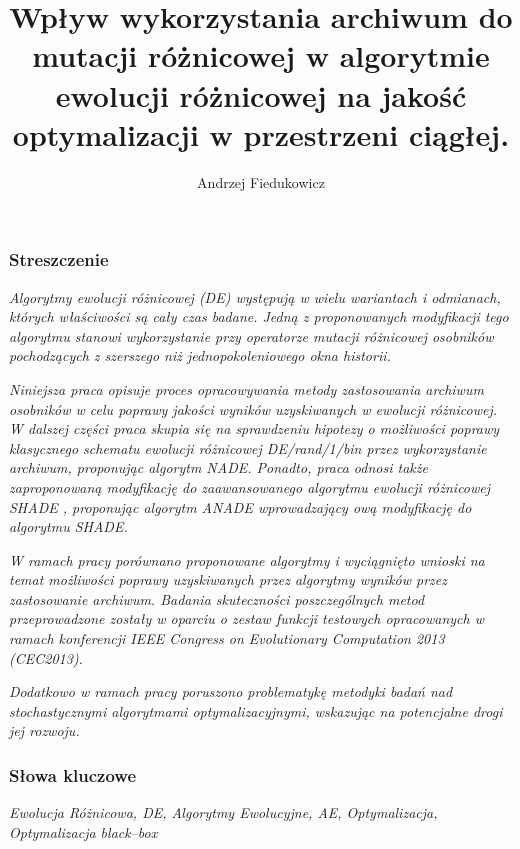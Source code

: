 \documentclass[12pt,a4paper]{report}
\title{\textbf{Wpływ wykorzystania archiwum do mutacji różnicowej w algorytmie ewolucji różnicowej na jakość optymalizacji w przestrzeni ciągłej.}}
\author{Andrzej Fiedukowicz}
\date{}
\begin{document}
\makeatletter
\renewcommand{\ALG@name}{Algorytm}


\maketitle
\tableofcontents


\newpage
\subsubsection{Streszczenie}
\par{
\emph{
Algorytmy ewolucji różnicowej (DE) występują w wielu wariantach i odmianach, których właściwości są cały czas badane. Jedną z proponowanych modyfikacji tego algorytmu stanowi wykorzystanie przy operatorze mutacji różnicowej osobników pochodzących z szerszego niż jednopokoleniowego okna historii.
}
}
\par{
\emph{
Niniejsza praca opisuje proces opracowywania metody zastosowania archiwum osobników w celu poprawy jakości wyników uzyskiwanych w ewolucji różnicowej. W dalszej części praca skupia się na sprawdzeniu hipotezy o możliwości poprawy klasycznego schematu ewolucji różnicowej \emph{DE/rand/1/bin} przez wykorzystanie archiwum, proponując algorytm \emph{NADE}.
Ponadto, praca odnosi także zaproponowaną modyfikację do zaawansowanego algorytmu ewolucji różnicowej \emph{SHADE} \cite{SHADE}, proponując algorytm \emph{ANADE} wprowadzający ową modyfikację do algorytmu \emph{SHADE}.
}
}
\par{
\emph{
W ramach pracy porównano proponowane algorytmy i wyciągnięto wnioski na temat możliwości poprawy uzyskiwanych przez algorytmy wyników przez zastosowanie archiwum. Badania skuteczności poszczególnych metod przeprowadzone zostały w oparciu o zestaw funkcji testowych opracowanych w ramach konferencji \emph{IEEE Congress on Evolutionary Computation 2013 (CEC2013)}.
}
}
\par{
\emph{
Dodatkowo w ramach pracy poruszono problematykę metodyki badań nad stochastycznymi algorytmami optymalizacyjnymi, wskazując na potencjalne drogi jej rozwoju.
}
}
\subsubsection{Słowa kluczowe}
\par{
\emph{Ewolucja Różnicowa, DE, Algorytmy Ewolucyjne, AE, Optymalizacja, Optymalizacja black--box}
}
\end{document}
